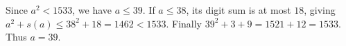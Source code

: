 Since $a^2<1533$, we have $a\le39$. If $a\le38$, its digit sum is at most $18$, giving $a^2+s(a)\le38^2+18=1462<1533$. Finally $39^2+3+9=1521+12=1533$. Thus $\boxed{a=39}$.
